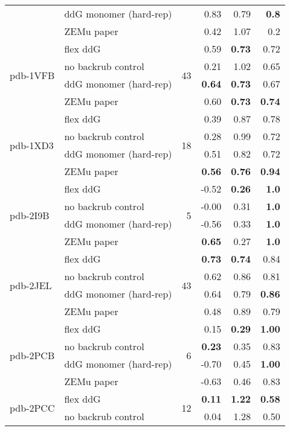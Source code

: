 \begin{table}
\begin{tabular}{llrrrr}
 & ddG monomer (hard-rep) & & 0.83 & 0.79 & \textbf{0.8}  \\
 & ZEMu paper & & 0.42 & 1.07 & 0.2  \\
\hline
 \multirow{ 4}{*}{pdb-1VFB} & flex ddG & \multirow{ 4}{*}{43} & 0.59 & \textbf{0.73} & 0.72  \\
 & no backrub control & & 0.21 & 1.02 & 0.65  \\
 & ddG monomer (hard-rep) & & \textbf{0.64} & \textbf{0.73} & 0.67  \\
 & ZEMu paper & & 0.60 & \textbf{0.73} & \textbf{0.74}  \\
\hline
 \multirow{ 4}{*}{pdb-1XD3} & flex ddG & \multirow{ 4}{*}{18} & 0.39 & 0.87 & 0.78  \\
 & no backrub control & & 0.28 & 0.99 & 0.72  \\
 & ddG monomer (hard-rep) & & 0.51 & 0.82 & 0.72  \\
 & ZEMu paper & & \textbf{0.56} & \textbf{0.76} & \textbf{0.94}  \\
\hline
 \multirow{ 4}{*}{pdb-2I9B} & flex ddG & \multirow{ 4}{*}{5} & -0.52 & \textbf{0.26} & \textbf{1.0}  \\
 & no backrub control & & -0.00 & 0.31 & \textbf{1.0}  \\
 & ddG monomer (hard-rep) & & -0.56 & 0.33 & \textbf{1.0}  \\
 & ZEMu paper & & \textbf{0.65} & 0.27 & \textbf{1.0}  \\
\hline
 \multirow{ 4}{*}{pdb-2JEL} & flex ddG & \multirow{ 4}{*}{43} & \textbf{0.73} & \textbf{0.74} & 0.84  \\
 & no backrub control & & 0.62 & 0.86 & 0.81  \\
 & ddG monomer (hard-rep) & & 0.64 & 0.79 & \textbf{0.86}  \\
 & ZEMu paper & & 0.48 & 0.89 & 0.79  \\
\hline
 \multirow{ 4}{*}{pdb-2PCB} & flex ddG & \multirow{ 4}{*}{6} & 0.15 & \textbf{0.29} & \textbf{1.00}  \\
 & no backrub control & & \textbf{0.23} & 0.35 & 0.83  \\
 & ddG monomer (hard-rep) & & -0.70 & 0.45 & \textbf{1.00}  \\
 & ZEMu paper & & -0.63 & 0.46 & 0.83  \\
\hline
 \multirow{ 4}{*}{pdb-2PCC} & flex ddG & \multirow{ 4}{*}{12} & \textbf{0.11} & \textbf{1.22} & \textbf{0.58}  \\
 & no backrub control & & 0.04 & 1.28 & 0.50  \\

\end{tabular}
\end{table}
